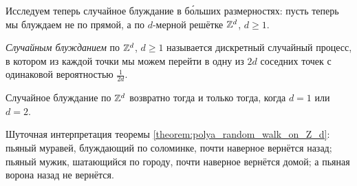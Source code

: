 \documentclass[../main.tex]{subfiles}
\begin{document}
 Исследуем теперь случайное блуждание в б\'{о}льших размерностях: пусть теперь мы блуждаем не по прямой, а по $ d $-мерной решётке $ \mathbb{Z}^{d} $, $ d \geqslant 1 $.

 \begin{df*}
  \textit{Случайным блужданием} по $ \mathbb{Z}^{d} $, $ d \geqslant 1 $ называется дискретный случайный процесс, в котором из каждой точки мы можем перейти в одну из $ 2d $ соседних точек с одинаковой вероятностью $ \frac{1}{2d} $.
 \end{df*}

 \begin{thm}
  \label{theorem:polya_random_walk_on_Z_d}
  Случайное блуждание по $ \mathbb{Z}^{d} $ возвратно тогда и только тогда, когда $ d=1 $ или $ d=2 $.
 \end{thm}

 Шуточная интерпретация теоремы \ref{theorem:polya_random_walk_on_Z_d}: пьяный муравей, блуждающий по соломинке, почти наверное вернётся назад; пьяный мужик, шатающийся по городу, почти наверное вернётся домой; а пьяная ворона назад не вернётся.
\end{document}
